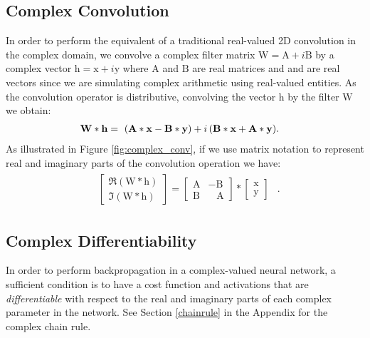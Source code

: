 \documentclass{article}
\begin{document}
\subsection{Complex Convolution}
In order to perform the equivalent of a traditional real-valued 2D convolution in the complex domain, we convolve a complex filter matrix $\bm{\mathrm{W}} = \bm{\mathrm{A}} + i\bm{\mathrm{B}}$ by a complex vector $\bm{\mathrm{h}} = \bm{\mathrm{x}} + i \bm{\mathrm{y}}$ where $\bm{\mathrm{A}}$ and $\bm{\mathrm{B}}$ are real matrices and  and  are real vectors since we are simulating complex arithmetic using real-valued entities. As the convolution operator is distributive, convolving the vector $\bm{\mathrm{h}}$ by the filter $\bm{\mathrm{W}}$ we obtain:
\begin{equation}\label{complex_conv}
\begin{aligned}
\bm{\mathrm{W}} * \bm{\mathrm{h}} &= \hphantom{i}(\bm{\mathrm{A}} * \bm{\mathrm{x}} - \bm{\mathrm{B}} * \bm{\mathrm{y}}) + i \, (\bm{\mathrm{B}} * \bm{\mathrm{x}} + \bm{\mathrm{A}} * \bm{\mathrm{y}}).
\end{aligned}
\end{equation}
As illustrated in Figure \ref{fig:complex_conv}, if we use matrix notation to represent real and imaginary parts of the convolution operation we have:
\begin{equation}\label{complex_conv_matrix}
\begin{aligned}
\begin{aligned}
\begin{bmatrix} \Re(\bm{\mathrm{W}} * \bm{\mathrm{h}})\\ \Im(\bm{\mathrm{W}} * \bm{\mathrm{h}})\end{bmatrix} = \begin{bmatrix} \bm{\mathrm{A}} & -\bm{\mathrm{B}}\\ \bm{\mathrm{B}} & \, \, \, \, \, \bm{\mathrm{A}}\end{bmatrix} * \begin{bmatrix}\bm{\mathrm{x}} \\ \bm{\mathrm{y}} \end{bmatrix}
\end{aligned}
\end{aligned}.
\end{equation}

\subsection{Complex Differentiability}
In order to perform backpropagation in a complex-valued neural network, a sufficient condition is to have a cost function and activations that are \textit{differentiable} with respect to the real and imaginary parts of each complex parameter in the network. See Section \ref{chainrule} in the Appendix for the complex chain rule.
\end{document}
